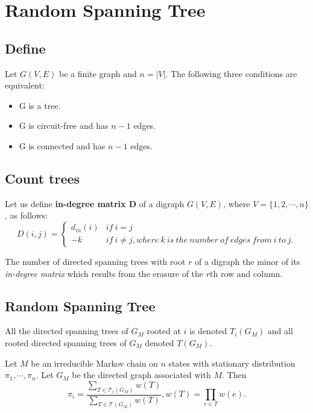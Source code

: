 \section{Random Spanning Tree}
\subsection{Define}
Let $G(V, E)$ be a finite graph and $n = |V|$. The following three conditions are equivalent:
\begin{itemize}
    \item G is a tree.
    \item G is circuit-free and has $n-1$ edges.
    \item G is connected and has $n-1$ edges.
\end{itemize}
\subsection{Count trees}
Let us define \textbf{in-degree matrix D} of a digraph $G(V, E)$, where $V=\{1, 2, \cdots, n\}$, as follows:
\[
    D(i, j)=\begin{cases}d_{in}(i) & if\ i=j \\ -k& if \ i \neq j, where\ k \ is \ the \ number \ of \ edges \ from \ i \ to \ j. \end{cases}
\]
\begin{theorem}
The number of directed spanning trees with root $r$ of a digraph the minor of its \emph{in-degree matrix} which results from the erasure of the $r$th row and column.
\end{theorem}

\subsection{Random Spanning Tree}
All the directed spanning trees of $G_M$ rooted at $i$ is denoted $T_{i}(G_M)$ and all rooted directed spanning trees of $G_M$ denoted $T(G_M)$.
\begin{theorem}
Let $M$ be an irreducible Markov chain on $n$ states with stationary distribution $\pi_1, \cdots, \pi_n$. Let $G_M$ be the directed graph associated with $M$. Then
\begin{equation}
    \pi_{i} = \frac{\sum_{T \in \mathcal{T}_i(G_M)}w(T)}{\sum_{T \in \mathcal{T}(G_M)}w(T)}, w(T) = \prod_{e \in T}{w(e)}.
\end{equation}
\end{theorem}

